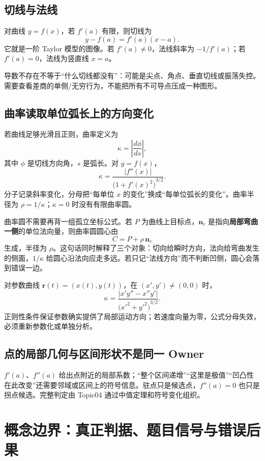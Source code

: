 \documentclass[11pt,a4paper]{ctexart}
\begin{document}
\subsection{切线与法线}

对曲线 $y=f(x)$，若 $f'(a)$ 有限，则切线为
\[
y-f(a)=f'(a)(x-a).
\]
它就是一阶 Taylor 模型的图像。若 $f'(a)\ne0$，法线斜率为 $-1/f'(a)$；若 $f'(a)=0$，法线为竖直线 $x=a$。

导数不存在不等于“什么切线都没有”：可能是尖点、角点、垂直切线或振荡失控。需要查看差商的单侧/无穷行为，不能把所有不可导点压成一种图形。

\subsection{曲率读取单位弧长上的方向变化}

若曲线足够光滑且正则，曲率定义为
\[
\kappa=\left\lvert\frac{d\phi}{ds}\right\rvert,
\]
其中 $\phi$ 是切线方向角，$s$ 是弧长。对 $y=f(x)$，
\[
\boxed{\kappa=\frac{\lvert f''(x)\rvert}{{\bigl(1+{f'(x)}^2\bigr)}^{3/2}}}.
\]
分子记录斜率变化，分母把“每单位 $x$ 的变化”换成“每单位弧长的变化”。曲率半径为 $\rho=1/\kappa$；$\kappa=0$ 时没有有限曲率圆。

曲率圆不需要再背一组孤立坐标公式。若 $P$ 为曲线上目标点，$\bm n_c$ 是指向\textbf{局部弯曲一侧}的单位法向量，则曲率圆圆心由
\[
\boxed{C=P+\rho\,\bm n_c}
\]
生成，半径为 $\rho$。这句话同时解释了三个对象：切向给瞬时方向，法向给弯曲发生的侧面，$1/\kappa$ 给圆心沿法向应走多远。若只记“法线方向”而不判断凹侧，圆心会落到错误一边。

对参数曲线 $\bm r(t)=(x(t),y(t))$，在 $(x',y')\ne(0,0)$ 时，
\[
\kappa=
\frac{\lvert x'y''-x''y'\rvert}{{\bigl({x'}^2+{y'}^2\bigr)}^{3/2}}.
\]
正则性条件保证参数确实提供了局部运动方向；若速度向量为零，公式分母失效，必须重新参数化或单独分析。

\subsection{点的局部几何与区间形状不是同一 Owner}

$f'(a)$、$f''(a)$ 给出点附近的局部系数；“整个区间递增”“这里是极值”“凹凸性在此改变”还需要邻域或区间上的符号信息。驻点只是候选点，$f''(a)=0$ 也只是拐点候选。完整判定由 Topic04 通过中值定理和符号变化组织。

\section{概念边界：真正判据、题目信号与错误后果}
\end{document}
